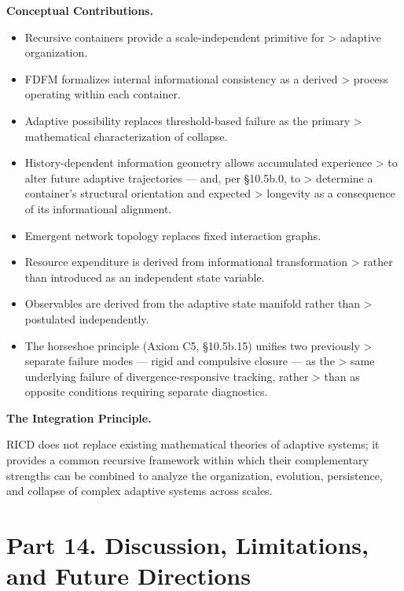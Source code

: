 \documentclass[
]{article}
\begin{document}
\textbf{Conceptual Contributions.}

\begin{itemize}
\item
  Recursive containers provide a scale-independent primitive for
  \textgreater{} adaptive organization.
\item
  FDFM formalizes internal informational consistency as a derived
  \textgreater{} process operating within each container.
\item
  Adaptive possibility replaces threshold-based failure as the primary
  \textgreater{} mathematical characterization of collapse.
\item
  History-dependent information geometry allows accumulated experience
  \textgreater{} to alter future adaptive trajectories --- and, per
  §10.5b.0, to \textgreater{} determine a container's structural
  orientation and expected \textgreater{} longevity as a consequence of
  its informational alignment.
\item
  Emergent network topology replaces fixed interaction graphs.
\item
  Resource expenditure is derived from informational transformation
  \textgreater{} rather than introduced as an independent state
  variable.
\item
  Observables are derived from the adaptive state manifold rather than
  \textgreater{} postulated independently.
\item
  The horseshoe principle (Axiom C5, §10.5b.15) unifies two previously
  \textgreater{} separate failure modes --- rigid and compulsive closure
  --- as the \textgreater{} same underlying failure of
  divergence-responsive tracking, rather \textgreater{} than as opposite
  conditions requiring separate diagnostics.
\end{itemize}

\textbf{The Integration Principle.}

RICD does not replace existing mathematical theories of adaptive
systems; it provides a common recursive framework within which their
complementary strengths can be combined to analyze the organization,
evolution, persistence, and collapse of complex adaptive systems across
scales.

\hypertarget{part-14.-discussion-limitations-and-future-directions}{%
\section{Part 14. Discussion, Limitations, and Future
Directions}\label{part-14.-discussion-limitations-and-future-directions}}
\end{document}
